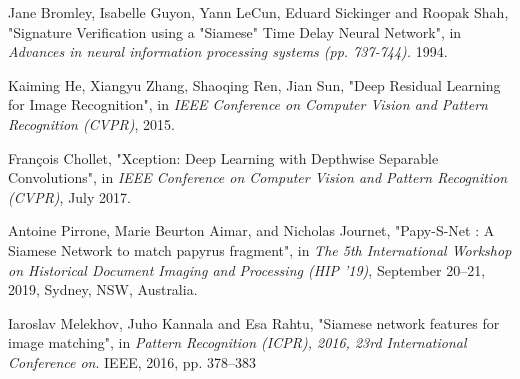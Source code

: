 \documentclass[11pt]{report}
\begin{document}
\begin{thebibliography}{9}
    
    Jane Bromley, Isabelle Guyon, Yann LeCun, Eduard Sickinger and Roopak Shah,
    "Signature Verification using a "Siamese" Time Delay Neural Network",
    in \emph{Advances in neural information processing systems (pp. 737-744).} 1994.
    
    Kaiming He, Xiangyu Zhang, Shaoqing Ren, Jian Sun,
    "Deep Residual Learning for Image Recognition",
    in \emph{IEEE Conference on Computer Vision and Pattern Recognition (CVPR)}, 2015.
    
    François Chollet,
    "Xception: Deep Learning with Depthwise Separable Convolutions",
    in \emph{IEEE Conference on Computer Vision and Pattern Recognition (CVPR)}, July 2017.

    Antoine Pirrone, Marie Beurton Aimar, and Nicholas Journet,
    "Papy-S-Net : A Siamese Network to match papyrus fragment",
    in \emph{The 5th International Workshop on Historical Document Imaging and Processing (HIP ’19)}, September 20–21, 2019, Sydney, NSW, Australia.
      
    Iaroslav Melekhov, Juho Kannala and Esa Rahtu,
    "Siamese  network  features  for image  matching",
    in \emph{Pattern  Recognition (ICPR), 2016, 23rd International Conference on}. IEEE, 2016, pp. 378–383

      
      
\end{thebibliography}
\end{document}
